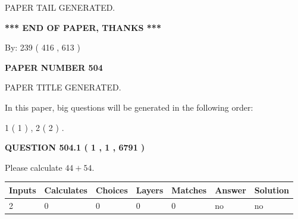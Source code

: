 \documentclass[12pt]{article}
\begin{document}
   
   
\vspace{2.0in} PAPER TAIL GENERATED.
   
   
   
   
\vspace{1.0in} 
{\textbf{\large{ *** END OF PAPER, THANKS *** }}} 
   
   
\hspace{1.0in} By: 
 239 ( 416 ,  613 )
   
   
   
   
\newpage 
\setcounter{page}{ 
   504001 } 
   
   
   
   
 {\textbf{ \Large{ PAPER NUMBER  504  }}}
   
   
\vspace{0.2in}
   
   
   
   
   
   
   
   
 \vspace{0.2in}
 
 
 
 
   
   
 PAPER TITLE GENERATED.
   
   
   
\vspace{0.2in}
   
In this paper, big questions will be generated in the following order: 
   
   
   1 ( 1 )
 ,
   2 ( 2 )
 .
  
\vspace{0.2in}
  
{\textbf{\Large{QUESTION
504.1 
 ( 1 , 1 , 6791 )
}}}
  
  
 
Please calculate $ %
44 +  %
54 $.
 
 
   
   
   
   
\noindent\begin{tabular}{|l|l|l|l|l|l|l|}
 \hline
Inputs & Calculates & Choices & Layers & Matches & Answer & Solution \\ \hline
 2  & 
 0  & 
 0
  & 
 0  & 
 0  & 
  no & 
  no 
  \\ \hline
 \end{tabular}
   
\end{document}
